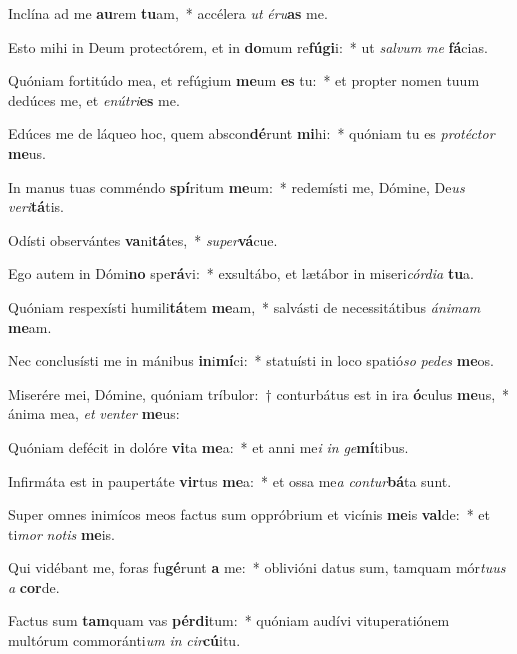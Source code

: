 \item Inclína ad me \textbf{au}rem \textbf{tu}am,~* accélera \textit{ut} \textit{é}\textit{ru}\textbf{as} me.
\item Esto mihi in Deum protectórem, et in \textbf{do}mum re\textbf{fú}\textbf{gi}i:~* ut \textit{sal}\textit{vum} \textit{me} \textbf{fá}cias.
\item Quóniam fortitúdo mea, et refúgium \textbf{me}um \textbf{es} tu:~* et propter nomen tuum dedúces me, et \textit{e}\textit{nú}\textit{tri}\textbf{es} me.
\item Edúces me de láqueo hoc, quem abscon\textbf{dé}runt \textbf{mi}hi:~* quóniam tu es \textit{pro}\textit{téc}\textit{tor} \textbf{me}us.
\item In manus tuas comméndo \textbf{spí}ritum \textbf{me}um:~* redemísti me, Dómine, De\textit{us} \textit{ve}\textit{ri}\textbf{tá}tis.
\item Odísti observántes \textbf{va}ni\textbf{tá}tes,~* \textit{su}\textit{per}\textbf{vá}cue.
\item Ego autem in Dómi\textbf{no} spe\textbf{rá}vi:~* exsultábo, et lætábor in miseri\textit{cór}\textit{di}\textit{a} \textbf{tu}a.
\item Quóniam respexísti humili\textbf{tá}tem \textbf{me}am,~* salvásti de necessitátibus \textit{á}\textit{ni}\textit{mam} \textbf{me}am.
\item Nec conclusísti me in mánibus \textbf{in}i\textbf{mí}ci:~* statuísti in loco spatió\textit{so} \textit{pe}\textit{des} \textbf{me}os.
\item Miserére mei, Dómine, quóniam tríbulor:~† conturbátus est in ira \textbf{ó}culus \textbf{me}us,~* ánima mea, \textit{et} \textit{ven}\textit{ter} \textbf{me}us:
\item Quóniam defécit in dolóre \textbf{vi}ta \textbf{me}a:~* et anni me\textit{i} \textit{in} \textit{ge}\textbf{mí}tibus.
\item Infirmáta est in paupertáte \textbf{vir}tus \textbf{me}a:~* et ossa me\textit{a} \textit{con}\textit{tur}\textbf{bá}ta sunt.
\item Super omnes inimícos meos factus sum oppróbrium et vicínis \textbf{me}is \textbf{val}de:~* et ti\textit{mor} \textit{no}\textit{tis} \textbf{me}is.
\item Qui vidébant me, foras fu\textbf{gé}runt \textbf{a} me:~* oblivióni datus sum, tamquam mór\textit{tu}\textit{us} \textit{a} \textbf{cor}de.
\item Factus sum \textbf{tam}quam vas \textbf{pér}\textbf{di}tum:~* quóniam audívi vituperatiónem multórum commoránti\textit{um} \textit{in} \textit{cir}\textbf{cú}itu.
